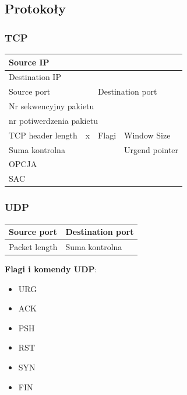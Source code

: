 \subsection{Protokoły}
\subsubsection{TCP}
\begin{table}[h]
	\begin{tabular}{|c|c|c|c|c|}
		\hline
		\multicolumn{5}{|l|}{Source IP}                 \\ \hline
		\multicolumn{5}{|l|}{Destination IP}                 \\ \hline
		\multicolumn{2}{|l|}{Source port} & \multicolumn{3}{l|}{Destination port}                \\ \hline
		\multicolumn{5}{|l|}{Nr sekwencyjny pakietu}                                             \\ \hline
		\multicolumn{5}{|l|}{nr potiwerdzenia pakietu}                                           \\ \hline
		TCP header length       & x       & Flagi          & \multicolumn{2}{l|}{Window Size}    \\ \hline
		\multicolumn{3}{|l|}{Suma kontrolna}               & \multicolumn{2}{l|}{Urgend pointer} \\ \hline
		\multicolumn{5}{|l|}{OPCJA}  \\ \hline
		\multicolumn{5}{|l|}{SAC}  \\ \hline
	\end{tabular}
\end{table}

\subsubsection{UDP}
\begin{table}[h]
	\begin{tabular}{|l|l|l|l|l|}
		\hline
		\multicolumn{2}{|l|}{Source port}   & \multicolumn{3}{l|}{Destination port} \\ \hline
		\multicolumn{2}{|l|}{Packet length} & \multicolumn{3}{l|}{Suma kontrolna}   \\ \hline
	\end{tabular}
\end{table}

\textbf{Flagi i komendy UDP}:
\begin{itemize}
	\item URG
	\item ACK
	\item PSH
	\item RST
	\item SYN
	\item FIN
\end{itemize}

